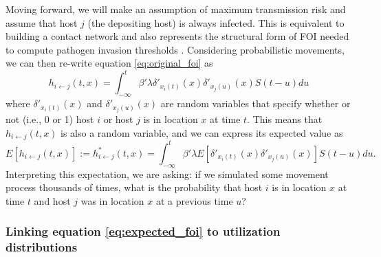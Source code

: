 \documentclass[letterpaper]{article}
\begin{document}
Moving forward, we will make an assumption of maximum transmission risk and assume that host $j$ (the depositing host) is always infected. 
This is equivalent to building a contact network and also represents the structural form of FOI needed to compute pathogen invasion thresholds \citep{Wilber2022}.
Considering probabilistic movements, we can then re-write equation \ref{eq:original_foi} as
\begin{equation}
    h_{i \leftarrow j}(t, x) = \int_{-\infty}^{t} \beta' \lambda \delta'_{x_i(t)}(x) \delta'_{x_j(u)}(x) S(t - u) du
    \label{eq:prob_foi}
\end{equation}
where $\delta'_{x_i(t)}(x)$ and $\delta'_{x_j(u)}(x)$ are random variables that specify whether or not (i.e., 0 or 1) host $i$ or host $j$ is in location $x$ at time $t$.  This means that $h_{i \leftarrow j}(t, x)$ is also a random variable, and we can express its expected value as 
\begin{equation}
    E[h_{i \leftarrow j}(t, x)] := h^*_{i \leftarrow j}(t, x) = \int_{-\infty}^{t} \beta' \lambda E[\delta'_{x_i(t)}(x) \delta'_{x_j(u)}(x)] S(t - u) du.
    \label{eq:expected_foi}
\end{equation}
Interpreting this expectation, we are asking: if we simulated some movement process thousands of times, what is the probability that host $i$ is in location $x$ at time $t$ and host $j$ was in location $x$ at a previous time $u$? 

\subsubsection*{Linking equation \ref{eq:expected_foi} to utilization distributions}
\end{document}
